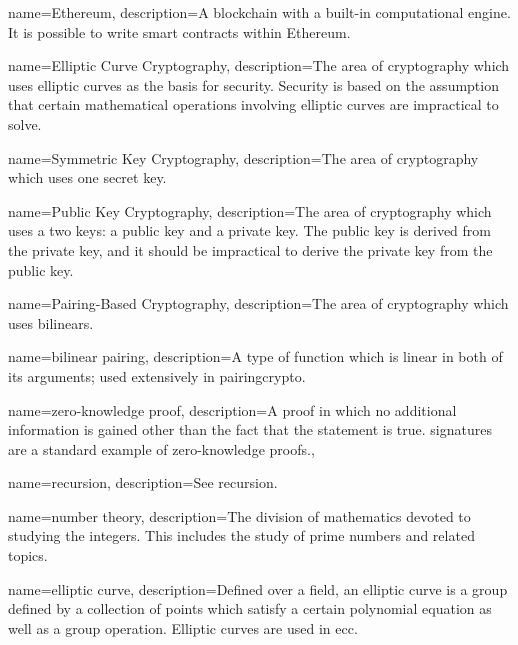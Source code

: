 {
    name={Ethereum},
    description={A blockchain with a built-in computational engine.
        It is possible to write \glspl{smart contract} within Ethereum.}
}

{
    name={Elliptic Curve Cryptography},
    description={The area of cryptography which uses \glspl{elliptic curve}
        as the basis for security.
        Security is based on the assumption that certain
        mathematical operations involving \glspl{elliptic curve}
        are impractical to solve.}
}

{
    name={Symmetric Key Cryptography},
    description={The area of cryptography which uses one secret key.}
}

{
    name={Public Key Cryptography},
    description={The area of cryptography which uses a two keys:
        a public key and a private key.
        The public key is derived from the private key,
        and it should be impractical to derive the private key
        from the public key.}
}

{
    name={Pairing-Based Cryptography},
    description={The area of cryptography which uses \glspl{bilinear}.}
}

{
    name={bilinear pairing},
    description={A type of \gls{function} which is linear
        in both of its arguments;
        used extensively in \gls{pairingcrypto}.}
}

{
    name={zero-knowledge proof},
    description={A proof in which no additional information
        is gained other than the fact that the statement is true.
        \Glspl{signature} are a standard example of zero-knowledge
        proofs.},
}

{
    name={recursion},
    description={See \gls{recursion}.}
}


{
    name={number theory},
    description={The division of mathematics devoted to studying
        the integers.
        This includes the study of prime numbers and related topics.}
}

{
    name={elliptic curve},
    description={Defined over a \gls{field}, an elliptic curve is a \gls{group}
        defined by a collection of points which satisfy a certain polynomial
        equation as well as a group operation.
        Elliptic curves are used in \gls{ecc}.}
}

